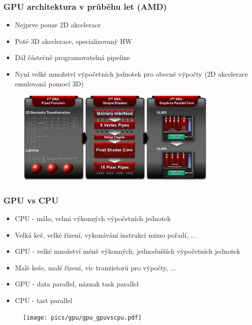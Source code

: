 
\begin{frame}
\frametitle{GPU architektura v průběhu let (AMD)}
	\begin{itemize}
	\item Nejprve pouze 2D akcelerace
	\item Poté 3D akcelerace, specializovaný HW
	\item Dál částečně programovatelná pipeline
	\item Nyní velké množství výpočetních jednotek pro obecné výpočty (2D akcelerace emulovaná pomocí 3D)
	\end{itemize}
	\begin{figure}[h]
	\includegraphics[width=10cm,keepaspectratio]{pics/gpu/gpu_amdevoluce}
	\end{figure}
\end{frame}

\begin{frame}
\frametitle{GPU vs CPU}
	\begin{itemize}
	\item CPU - málo, velmi výkonných výpočetních jednotek
	\item Velká keš, velké řízení, vykonávání instrukcí mimo pořadí, ...
	\item GPU - velké množství méně výkonných, jednodušších výpočetních jednotek
	\item Malé keše, malé řízení, víc tranzistorů pro výpočty, ...
  \item GPU - data parallel, náznak task parallel
  \item CPU - tast parallel
	\end{itemize}
	\begin{figure}[h]
	\texttt{[image: pics/gpu/gpu\_gpuvscpu.pdf]}
	\end{figure}
\end{frame}

